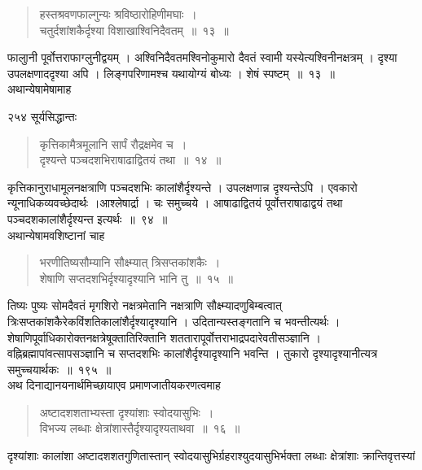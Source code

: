 \documentclass[11pt, openany]{book}
\begin{document}
\begin{quote}
{\ssi हस्तश्रवणफाल्गुन्यः श्रविष्ठारोहिणीमघाः~। \\
चतुर्दशांशकैर्दृश्या विशाखाश्विनिदैवतम्~॥~१३~॥}
\end{quote}

 फालुानी पूर्वोत्तराफाग्लुनीद्वयम् । अश्विनिदैवतमश्विनोकुमारो दैवतं स्वामी यस्येत्यश्विनीनक्षत्रम् । दृश्या उपलक्षणाददृश्या अपि । लिङ्गपरिणामश्च यथायोग्यं बोध्यः । शेषं स्पष्टम्~॥~१३~॥ \\
\noindent अथान्येषामेषामाह \textendash

\newpage


\noindent २५४ \hspace{4cm} सूर्यसिद्धान्तः 

\begin{quote}
{\ssi कृत्तिकामैत्रमूलानि सार्पं रौद्रक्षमेव च~।\\
 दृश्यन्ते पञ्चदशभिराषाढाद्वितयं तथा~॥~१४~॥ }
\end{quote}

 कृत्तिकानुराधामूलनक्षत्राणि पञ्चदशभिः कालांशैर्दृश्यन्ते । उपलक्षणान्न दृश्यन्तेऽपि । एवकारो न्यूनाधिकव्यवच्छेदार्थः ।आश्लेषार्द्रा । चः समुच्चये । आषाढाद्वितयं पूर्वोत्तराषाढाद्वयं तथा पञ्चदशकालांशैर्दृश्यन्त इत्यर्थः~॥~९४~॥\\ 
 \noindent अथान्येषामवशिष्टानां चाह \textendash 

 \begin{quote}
 {\ssi भरणीतिष्यसौम्यानि सौक्ष्म्यात् त्रिसप्तकांशकैः~। \\
 शेषाणि सप्तदशभिर्दृश्यादृश्यानि भानि तु~॥~१५~॥ }
\end{quote}
 तिष्यः पुष्यः सोमदैवतं मृगशिरो नक्षत्रमेतानि नक्षत्राणि सौक्ष्म्यादणुबिम्बत्वात् त्रिःसप्तकांशकैरेकविंशतिकालांशैर्दृश्यादृश्यानि । उदितान्यस्तङ्गतानि च भवन्तीत्यर्थः । शेषाणिपूर्वाधिकारोक्तनक्षत्रेषूक्तातिरिक्तानि शततारापूर्वोत्तराभाद्रपदारेवतीसञ्ज्ञानि । वह्निब्रह्मापांवत्सापसञ्ज्ञानि च सप्तदशभिः कालांशैर्दृश्यादृश्यानि भवन्ति । तुकारो दृश्यादृश्यानीत्यत्र समुच्चयार्थकः~॥~१९५~॥\\
\noindent अथ दिनाद्यानयनार्थमिच्छायाएव प्रमाणजातीयकरणत्वमाह \textendash

\begin{quote}
{\ssi अष्टादशशताभ्यस्ता दृश्यांशाः स्वोदयासुभिः~। \\
विभज्य लब्धाः क्षेत्रांशास्तैर्दृश्यादृश्यताथवा~॥~१६~॥}
\end{quote}
 दृश्यांशाः कालांशा अष्टादशशतगुणितास्तान् स्वोदयासुभिर्ग्रहराश्युदयासुभिर्भक्ता लब्धाः क्षेत्रांशाः क्रान्तिवृत्तस्यां \textendash  
\end{document}
